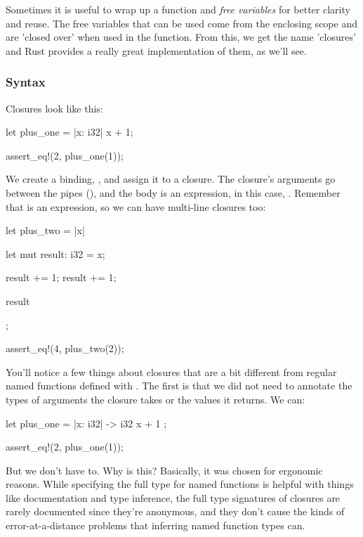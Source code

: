 Sometimes it is useful to wrap up a function and \emph{free variables} for better clarity and reuse. The free variables that can be used 
come from the enclosing scope and are 'closed over' when used in the function. From this, we get the name 'closures' and Rust provides a 
really great implementation of them, as we'll see.

\subsubsection*{Syntax}

Closures look like this:

\begin{rustc}
let plus_one = |x: i32| x + 1;

assert_eq!(2, plus_one(1));
\end{rustc}

We create a binding, , and assign it to a closure. The closure's arguments go between the pipes (\code{|}), and the body 
is an expression, in this case, . Remember that \code{\{ \}} is an expression, so we can have multi-line closures too:

\begin{rustc}
let plus_two = |x| {
    let mut result: i32 = x;

    result += 1;
    result += 1;

    result
};

assert_eq!(4, plus_two(2));
\end{rustc}

You'll notice a few things about closures that are a bit different from regular named functions defined with . The first is that 
we did not need to annotate the types of arguments the closure takes or the values it returns. We can:

\begin{rustc}
let plus_one = |x: i32| -> i32 { x + 1 };

assert_eq!(2, plus_one(1));
\end{rustc}

But we don't have to. Why is this? Basically, it was chosen for ergonomic reasons. While specifying the full type for named functions 
is helpful with things like documentation and type inference, the full type signatures of closures are rarely documented since they're 
anonymous, and they don't cause the kinds of error-at-a-distance problems that inferring named function types can.

\blank

